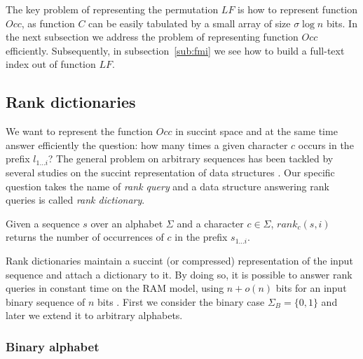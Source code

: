 The key problem of representing the permutation $LF$ is how to represent function $Occ$, as function $C$ can be easily tabulated by a small array of size $\sigma \log{n}$ bits.
In the next subsection we address the problem of representing function $Occ$ efficiently. Subsequently, in subsection~\ref{sub:fmi} we see how to build a full-text index out of function $LF$.

\subsection{Rank dictionaries}

We want to represent the function $Occ$ in succint space and at the same time answer efficiently the question: how many times a given character $c$ occurs in the prefix $l_{1 \dots i}$?
The general problem on arbitrary sequences has been tackled by several studies on the succint representation of data structures \citep{Jacobson1989}.
Our specific question takes the name of \emph{rank query} and a data structure answering rank queries is called \emph{rank dictionary}.

\begin{definition}
Given a sequence $s$ over an alphabet $\Sigma$ and a character $c \in \Sigma$, $rank_c(s, i)$ returns the number of occurrences of $c$ in the prefix $s_{1 \dots i}$.
\end{definition}

Rank dictionaries maintain a succint (or compressed) representation of the input sequence and attach a dictionary to it.
By doing so, it is possible to answer rank queries in constant time on the RAM model, using $n+o(n)$ bits for an input binary sequence of $n$ bits \citep{Jacobson1989}.
First we consider the binary case $\Sigma_B = \{ 0, 1 \}$ and later we extend it to arbitrary alphabets.

\subsubsection{Binary alphabet}


